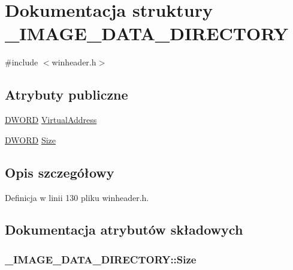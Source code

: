 \hypertarget{struct___i_m_a_g_e___d_a_t_a___d_i_r_e_c_t_o_r_y}{\section{Dokumentacja struktury \-\_\-\-I\-M\-A\-G\-E\-\_\-\-D\-A\-T\-A\-\_\-\-D\-I\-R\-E\-C\-T\-O\-R\-Y}
\label{struct___i_m_a_g_e___d_a_t_a___d_i_r_e_c_t_o_r_y}
}


{\ttfamily \#include $<$winheader.\-h$>$}

\subsection*{Atrybuty publiczne}
\begin{DoxyCompactItemize}
\item 
\hyperlink{winheader_8h_af483253b2143078cede883fc3c111ad2}{D\-W\-O\-R\-D} \hyperlink{struct___i_m_a_g_e___d_a_t_a___d_i_r_e_c_t_o_r_y_a4367862469fd1ea60088ae02b1b6df70}{Virtual\-Address}
\item 
\hyperlink{winheader_8h_af483253b2143078cede883fc3c111ad2}{D\-W\-O\-R\-D} \hyperlink{struct___i_m_a_g_e___d_a_t_a___d_i_r_e_c_t_o_r_y_ab5bfce429cb0243cdc216f514108aa85}{Size}
\end{DoxyCompactItemize}


\subsection{Opis szczegółowy}


Definicja w linii 130 pliku winheader.\-h.



\subsection{Dokumentacja atrybutów składowych}
\hypertarget{struct___i_m_a_g_e___d_a_t_a___d_i_r_e_c_t_o_r_y_ab5bfce429cb0243cdc216f514108aa85}{
\subsubsection[{Size}]{ \-\_\-\-I\-M\-A\-G\-E\-\_\-\-D\-A\-T\-A\-\_\-\-D\-I\-R\-E\-C\-T\-O\-R\-Y\-::\-Size}}\label{struct___i_m_a_g_e___d_a_t_a___d_i_r_e_c_t_o_r_y_ab5bfce429cb0243cdc216f514108aa85}


